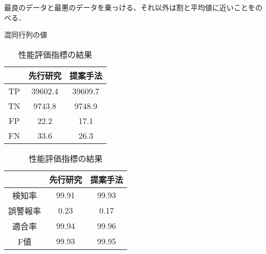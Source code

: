 最良のデータと最悪のデータを乗っける、それ以外は割と平均値に近いことをのべる．
\begin{table}[tb]
  \centering
  \begin{minipage}{0.45\textwidth}  %
      \centering
      \caption{混同行列の値}  %
      \begin{tabular}{|c|c|c|}  %
          \hline  %
          ~ &先行研究 & 提案手法\\  %
          \hline  %
          TP & 39602.4 & 39609.7\\  %
          \hline  %
          TN & 9743.8 & 9748.9\\  %
          \hline  %
          FP & 22.2 & 17.1\\  %
          \hline  %
          FN & 33.6 & 26.3\\  %
          \hline  %
      \end{tabular}
      \label{result2}  %
  \end{minipage} \hspace{1cm}  %
  \begin{minipage}{0.45\textwidth}  %
      \centering
      \caption{性能評価指標の結果}  %
      \begin{tabular}{|c|c|c|}  %
          \hline  %
          ~ &先行研究 & 提案手法\\  %
          \hline  %
          検知率 & 99.91 & 99.93\\  %
          \hline  %
          誤警報率 & 0.23 & 0.17\\  %
          \hline  %
          適合率 & 99.94 & 99.96\\  %
          \hline  %
          F値 & 99.93 & 99.95\\  %
          \hline  %
      \end{tabular}
      \label{result3}  %
  \end{minipage}
\end{table}
